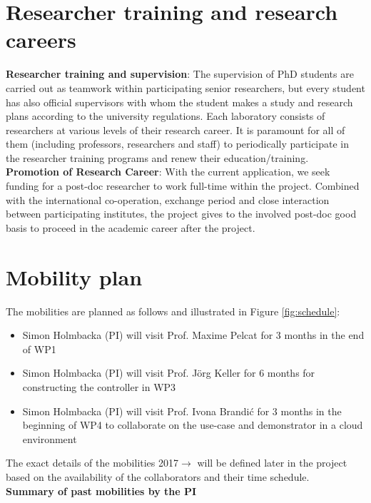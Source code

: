 \documentclass{article}
\begin{document}
\section{Researcher training and research careers}
\textbf{Researcher training and supervision}: The supervision of PhD students are carried out as teamwork within participating senior researchers, 
but every student has also official supervisors with whom the student makes a study and research plans according to the university regulations. 
Each laboratory consists of researchers at various levels of their research career. 
It is paramount for all of them (including professors, researchers and staff) to periodically participate in the researcher training programs and renew their education/training.\\ 
\textbf{Promotion of Research Career}: With the current application, we seek funding for a post-doc researcher to work full-time within the project. 
Combined with the international co-operation, exchange period and close interaction between participating institutes, the project gives to the involved post-doc good basis to proceed in the academic career after the project.

\section{Mobility plan}
The mobilities are planned as follows and illustrated in Figure \ref{fig:schedule}:
\begin{itemize}
 \item Simon Holmbacka (PI) will visit Prof. Maxime Pelcat for 3 months in the end of WP1 \vspace{-0.3cm}
 \item Simon Holmbacka (PI) will visit Prof. J\"{o}rg Keller for 6 months for constructing the controller in WP3 \vspace{-0.3cm}
 \item Simon Holmbacka (PI) will visit Prof. Ivona Brandi\'{c} for 3 months in the beginning of WP4 to collaborate on the use-case and demonstrator in a cloud environment

\end{itemize}


The exact details of the mobilities 2017$\longrightarrow$ will be defined later in the project based on the availability of the collaborators and their time schedule.\\

\textbf{Summary of past mobilities by the PI}\\
\end{document}

